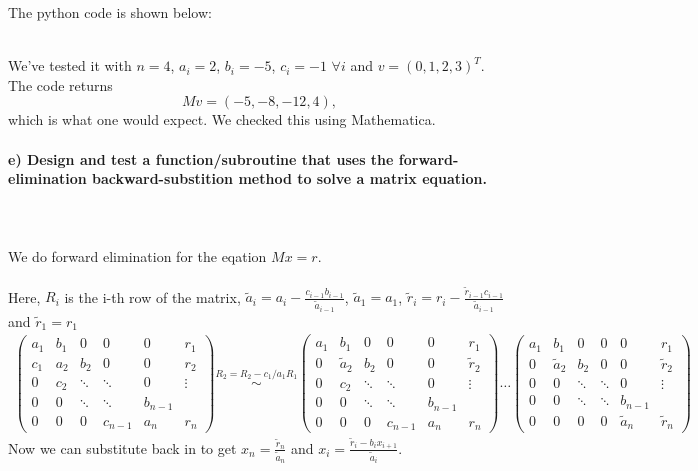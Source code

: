     The python code is shown below:
    
    \ \\
    We've tested it with $n=4$, $a_i = 2$, $b_i = -5$,
    $c_i = -1$ $ \forall i$ and $v = (0,1,2,3)^T$. The code returns
    \begin{equation}
    	Mv = (-5, -8, -12, 4),
    \end{equation}
    which is what one would expect. We checked this using Mathematica. \\

\newpage
\paragraph{
    e) Design and test a function/subroutine that uses the
    forward-elimination backward-substition method to solve a matrix
    equation.
} \ \\
    \\
    We do forward elimination for the eqation $Mx = r$. \\
    \\
    Here, $R_i$ is the i-th row of the matrix, 
    $\tilde{a}_i = a_i - \frac{c_{i-1} b_{i-1}}{\tilde{a}_{i-1}}$, 
    $\tilde{a}_1 = a_1$, 
    $\tilde{r}_i = r_i - \frac{\tilde{r}_{i-1} c_{i-1}}{\tilde{a}_{i-1}}$ and 
    $\tilde{r}_1 = r_1$ \\
    \begin{align}
	\begin{pmatrix}
	a_1 & b_1 & 0      & 0       & 0   & r_1\\
	c_1 & a_2 & b_2    & 0       & 0 & r_2\\
	0   & c_2 & \ddots & \ddots  & 0 & \vdots\\
	0   & 0   & \ddots & \ddots  & b_{n-1} &\\
	0   & 0   & 0      & c_{n-1} & a_n& r_n
	\end{pmatrix}
	\overset{R_2 = R_2 - c_1/a_1 R_1}{\sim}
	\begin{pmatrix}
	a_1 & b_1 & 0      & 0       & 0   & r_1\\
	0 & \tilde{a}_2 & b_2    & 0       & 0 & \tilde{r}_2\\
	0   & c_2 & \ddots & \ddots  & 0 & \vdots\\
	0   & 0   & \ddots & \ddots  & b_{n-1} &\\
	0   & 0   & 0      & c_{n-1} & a_n& r_n
	\end{pmatrix}
	\dots
	\begin{pmatrix}
	a_1 & b_1 & 0      & 0       & 0   & r_1\\
	0 & \tilde{a}_2 & b_2    & 0       & 0 & \tilde{r}_2\\
	0   & 0 & \ddots & \ddots  & 0 & \vdots\\
	0   & 0   & \ddots & \ddots  & b_{n-1} &\\
	0   & 0   & 0      & 0 & \tilde{a}_n& \tilde{r}_n
	\end{pmatrix}
    \end{align}
    Now we can substitute back in to get
    $x_n = \frac{\tilde{r}_n}{\tilde{a}_n} $ and
    $x_i = \frac{\tilde{r}_{i} - b_{i} x_{i+1}}{\tilde{a}_{i}}$.

